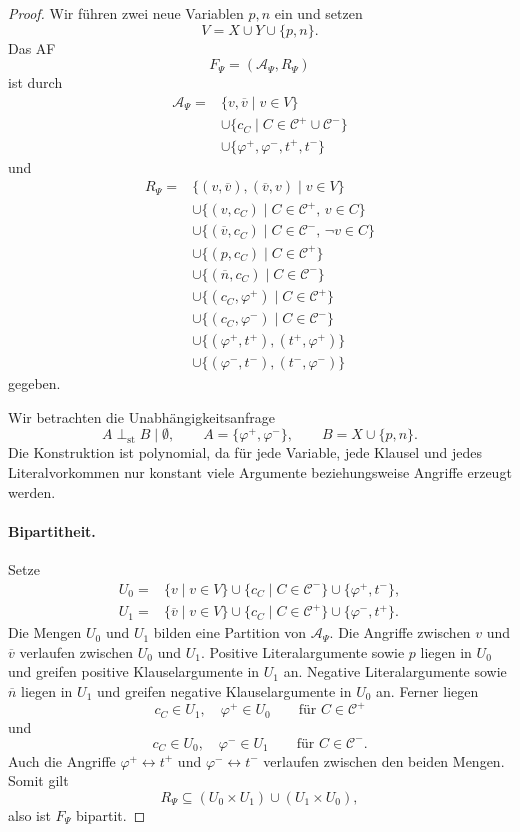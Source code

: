 \begin{proof}
Wir führen zwei neue Variablen \(p,n\) ein und setzen
\[
    V=X\cup Y\cup\{p,n\}.
\]
Das AF
\[
    F_\Psi=(\mathcal A_\Psi,R_\Psi)
\]
ist durch
\[
\begin{aligned}
    \mathcal A_\Psi
    ={}&
    \{v,\overline v\mid v\in V\}\\
    &\cup
    \{c_C\mid C\in\mathcal C^+\cup\mathcal C^-\}\\
    &\cup
    \{\varphi^+,\varphi^-,t^+,t^-\}
\end{aligned}
\]
und
\[
\begin{aligned}
    R_\Psi
    ={}&
    \{(v,\overline v),(\overline v,v)\mid v\in V\}\\
    &\cup
    \{(v,c_C)\mid C\in\mathcal C^+,\,v\in C\}\\
    &\cup
    \{(\overline v,c_C)
        \mid C\in\mathcal C^-,\,\neg v\in C\}\\
    &\cup
    \{(p,c_C)\mid C\in\mathcal C^+\}\\
    &\cup
    \{(\overline n,c_C)\mid C\in\mathcal C^-\}\\
    &\cup
    \{(c_C,\varphi^+)\mid C\in\mathcal C^+\}\\
    &\cup
    \{(c_C,\varphi^-)\mid C\in\mathcal C^-\}\\
    &\cup
    \{(\varphi^+,t^+),(t^+,\varphi^+)\}\\
    &\cup
    \{(\varphi^-,t^-),(t^-,\varphi^-)\}
\end{aligned}
\]
gegeben.

Wir betrachten die Unabhängigkeitsanfrage
\[
    A\perp_{\mathrm{st}}B\mid\emptyset,
    \qquad
    A=\{\varphi^+,\varphi^-\},
    \qquad
    B=X\cup\{p,n\}.
\]
Die Konstruktion ist polynomial, da für jede Variable, jede Klausel und
jedes Literalvorkommen nur konstant viele Argumente beziehungsweise
Angriffe erzeugt werden.

\paragraph{Bipartitheit.}
Setze
\[
\begin{aligned}
    U_0={}&
    \{v\mid v\in V\}
    \cup
    \{c_C\mid C\in\mathcal C^-\}
    \cup
    \{\varphi^+,t^-\},\\
    U_1={}&
    \{\overline v\mid v\in V\}
    \cup
    \{c_C\mid C\in\mathcal C^+\}
    \cup
    \{\varphi^-,t^+\}.
\end{aligned}
\]
Die Mengen \(U_0\) und \(U_1\) bilden eine Partition von
\(\mathcal A_\Psi\). Die Angriffe zwischen \(v\) und \(\overline v\)
verlaufen zwischen \(U_0\) und \(U_1\). Positive Literalargumente sowie
\(p\) liegen in \(U_0\) und greifen positive Klauselargumente in \(U_1\)
an. Negative Literalargumente sowie \(\overline n\) liegen in \(U_1\) und
greifen negative Klauselargumente in \(U_0\) an. Ferner liegen
\[
    c_C\in U_1,\quad \varphi^+\in U_0
    \qquad\text{für }C\in\mathcal C^+
\]
und
\[
    c_C\in U_0,\quad \varphi^-\in U_1
    \qquad\text{für }C\in\mathcal C^-.
\]
Auch die Angriffe
\(\varphi^+\leftrightarrow t^+\) und
\(\varphi^-\leftrightarrow t^-\) verlaufen zwischen den beiden Mengen.
Somit gilt
\[
    R_\Psi
    \subseteq
    (U_0\times U_1)\cup(U_1\times U_0),
\]
also ist \(F_\Psi\) bipartit.


\end{proof}

